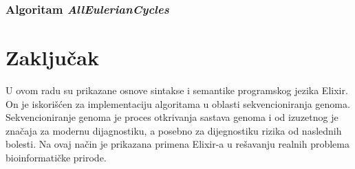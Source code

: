 \documentclass[12pt,oneside]{memoir}
\begin{document}
% 


\subsection{Algoritam \textit{AllEulerianCycles}}


% 

\chapter{Zaključak}
\label{poglavlje:Zaključak}

U ovom radu su prikazane osnove sintakse i semantike programskog jezika Elixir. On je iskorišćen za implementaciju algoritama u oblasti sekvencioniranja genoma. Sekvencioniranje genoma je proces otkrivanja sastava genoma i od izuzetnog je značaja za modernu dijagnostiku, a posebno za dijegnostiku rizika od naslednih bolesti. Na ovaj način je prikazana primena Elixir-a u rešavanju realnih problema bioinformatičke prirode.
\end{document}
